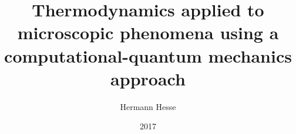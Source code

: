 \documentclass[handout]{beamer}
\begin{document}
\title{Thermodynamics applied to microscopic phenomena using a computational-quantum mechanics approach}
\author[Hermann]{Hermann Hesse}
\date{2017}

\begin{frame}[plain]
\vspace{-2cm}
\titlepage
\end{frame}
\end{document}
